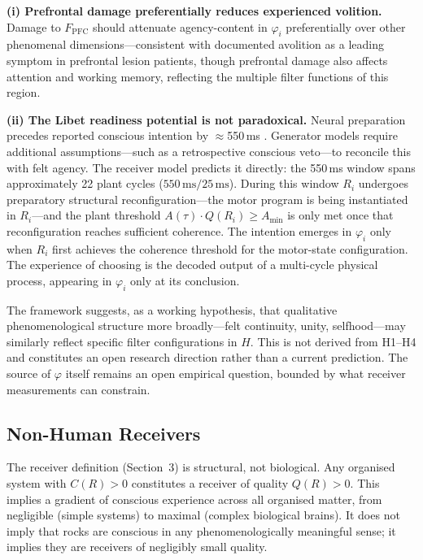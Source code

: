 \documentclass[12pt]{article}
\begin{document}
\textbf{(i) Prefrontal damage preferentially reduces experienced volition.} Damage to $F_{\mathrm{PFC}}$ should attenuate agency-content in $\varphi_i$ preferentially over other phenomenal dimensions---consistent with documented avolition as a leading symptom in prefrontal lesion patients, though prefrontal damage also affects attention and working memory, reflecting the multiple filter functions of this region.

\textbf{(ii) The Libet readiness potential is not paradoxical.} Neural preparation precedes reported conscious intention by $\approx$550\,ms \cite{libet1983}. Generator models require additional assumptions---such as a retrospective conscious veto---to reconcile this with felt agency. The receiver model predicts it directly: the 550\,ms window spans approximately 22 plant cycles ($550\,\mathrm{ms}/25\,\mathrm{ms}$). During this window $R_i$ undergoes preparatory structural reconfiguration---the motor program is being instantiated in $R_i$---and the plant threshold $A(\tau)\cdot Q(R_i)\geq A_{\min}$ is only met once that reconfiguration reaches sufficient coherence. The intention emerges in $\varphi_i$ only when $R_i$ first achieves the coherence threshold for the motor-state configuration. The experience of choosing is the decoded output of a multi-cycle physical process, appearing in $\varphi_i$ only at its conclusion.

The framework suggests, as a working hypothesis, that qualitative phenomenological structure more broadly---felt continuity, unity, selfhood---may similarly reflect specific filter configurations in $H$. This is not derived from H1--H4 and constitutes an open research direction rather than a current prediction. The source of $\varphi$ itself remains an open empirical question, bounded by what receiver measurements can constrain.

\subsection{Non-Human Receivers}

The receiver definition (Section~3) is structural, not biological. Any organised system with $C(R) > 0$ constitutes a receiver of quality $Q(R) > 0$. This implies a gradient of conscious experience across all organised matter, from negligible (simple systems) to maximal (complex biological brains). It does not imply that rocks are conscious in any phenomenologically meaningful sense; it implies they are receivers of negligibly small quality.
\end{document}
